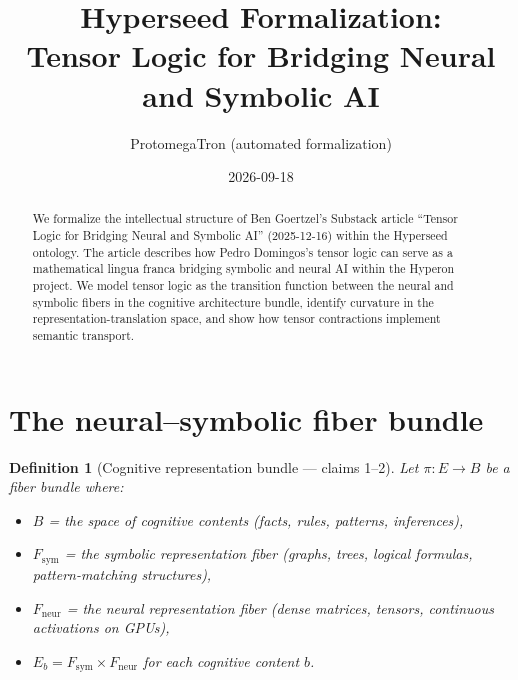 \documentclass[11pt,a4paper]{article}
\title{Hyperseed Formalization:\\
  Tensor Logic for Bridging Neural and Symbolic AI}
\author{ProtomegaTron (automated formalization)}
\date{2026-09-18}
\newtheorem{definition}{Definition}[section]
\begin{document}
\maketitle

\begin{abstract}
We formalize the intellectual structure of Ben Goertzel's Substack article
``Tensor Logic for Bridging Neural and Symbolic AI'' (2025-12-16) within
the Hyperseed ontology. The article describes how Pedro Domingos's tensor
logic can serve as a mathematical lingua franca bridging symbolic and
neural AI within the Hyperon project. We model tensor logic as the
transition function between the neural and symbolic fibers in the
cognitive architecture bundle, identify curvature in the
representation-translation space, and show how tensor contractions
implement semantic transport.
\end{abstract}

\tableofcontents

\section{The neural--symbolic fiber bundle}
\label{sec:bundle}

\begin{definition}[Cognitive representation bundle --- claims 1--2]
\label{def:rep-bundle}
Let $\pi : E \to B$ be a fiber bundle where:
\begin{itemize}
\item $B$ = the space of cognitive contents (facts, rules, patterns,
  inferences),
\item $F_{\text{sym}}$ = the symbolic representation fiber (graphs, trees,
  logical formulas, pattern-matching structures),
\item $F_{\text{neur}}$ = the neural representation fiber (dense
  matrices, tensors, continuous activations on GPUs),
\item $E_b = F_{\text{sym}} \times F_{\text{neur}}$ for each cognitive
  content $b$.
\end{itemize}
\end{definition}
\end{document}
